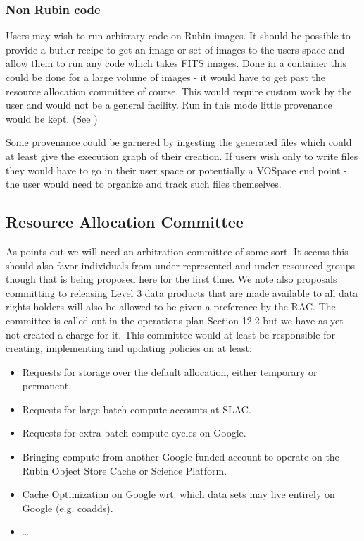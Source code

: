 \subsubsection{Non Rubin code} \label{sec:othercode}
Users may wish to run arbitrary code on Rubin images.
It should be possible to provide a butler recipe to get an image or set of images to the users space and allow them to run any code which takes FITS images.
Done in a container this could be done for a large volume of images - it would have to get past  the resource allocation committee of course.
This would require custom work by the user and would not be a general facility.
Run in this mode little provenance would be kept.  (See )

Some provenance could be garnered by ingesting the generated files which could at least give the execution graph of their creation.
If users wish only to write files they would have to go in their user space or potentially a VOSpace end point - the user would need to organize and track such files themselves.


\subsection{Resource Allocation Committee}\label{sec:arbitration}
As  points out we will need an arbitration committee of some sort.
It seems this should also favor individuals from under represented  and under resourced groups though that is being proposed here for the first time.
We note also  proposals committing to releasing Level 3 data products that are made available to all data rights holders will also  be allowed to be given a preference by the RAC.
The committee is called out in the operations plan  Section 12.2 but we have as yet not created a charge for it.
This committee would at least be responsible for creating, implementing and updating  policies on at least:

\begin{itemize}
\item Requests for storage over the default allocation, either temporary or permanent.
\item Requests for large batch compute accounts at SLAC.
\item Requests for extra batch compute cycles on Google.
\item Bringing compute from another Google funded account to operate on the Rubin Object Store Cache or Science Platform.
\item Cache Optimization on Google wrt. which data sets may live entirely on Google (e.g. coadds).
\item \ldots
\end{itemize}

